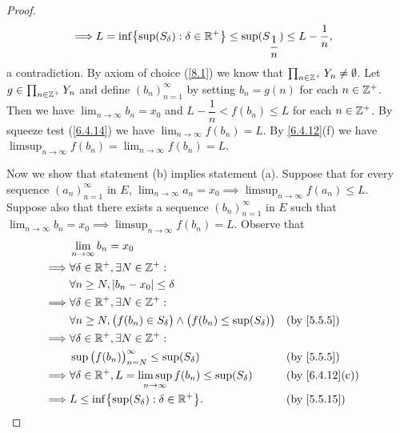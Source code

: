 \begin{proof}
\begin{align*}
    \implies & L = \inf\set{\sup(S_{\delta}) : \delta \in \R^+} \leq \sup(S_{\dfrac{1}{n}}) \leq L - \dfrac{1}{n},
  \end{align*}
  a contradiction.
  By axiom of choice (\cref{8.1}) we know that \(\prod_{n \in \mathbb{Z}^+} Y_n \neq \emptyset\).
  Let \(g \in \prod_{n \in \mathbb{Z}^+} Y_n\) and define \((b_n)_{n = 1}^\infty\) by setting \(b_n = g(n)\) for each \(n \in \mathbb{Z}^+\).
  Then we have \(\lim_{n \to \infty} b_n = x_0\) and \(L - \dfrac{1}{n} < f(b_n) \leq L\) for each \(n \in \mathbb{Z}^+\).
  By squeeze test (\cref{6.4.14}) we have \(\lim_{n \to \infty} f(b_n) = L\).
  By \cref{6.4.12}(f) we have \(\limsup_{n \to \infty} f(b_n) = \lim_{n \to \infty} f(b_n) = L\).

  Now we show that statement (b) implies statement (a).
  Suppose that for every sequence \((a_n)_{n = 1}^\infty\) in \(E\), \(\lim_{n \to \infty} a_n = x_0 \implies \limsup_{n \to \infty} f(a_n) \leq L\).
  Suppose also that there exists a sequence \((b_n)_{n = 1}^\infty\) in \(E\) such that \(\lim_{n \to \infty} b_n = x_0 \implies \limsup_{n \to \infty} f(b_n) = L\).
  Observe that
  \begin{align*}
             & \lim_{n \to \infty} b_n = x_0                                                                                      \\
    \implies & \forall \delta \in \R^+, \exists N \in \Z^+ :                                                                      \\
             & \forall n \geq N, \abs{b_n - x_0} \leq \delta                                                                      \\
    \implies & \forall \delta \in \R^+, \exists N \in \Z^+ :                                                                      \\
             & \forall n \geq N, \big(f(b_n) \in S_{\delta}\big) \land \big(f(b_n) \leq \sup(S_{\delta})\big) &  & \by{5.5.5}     \\
    \implies & \forall \delta \in \R^+, \exists N \in \Z^+ :                                                                      \\
             & \sup\big(f(b_n)\big)_{n = N}^\infty \leq \sup(S_{\delta})                                      &  & \by{5.5.5}     \\
    \implies & \forall \delta \in \R^+, L = \limsup_{n \to \infty} f(b_n) \leq \sup(S_{\delta})               &  & \by{6.4.12}[c] \\
    \implies & L \leq \inf\set{\sup(S_{\delta}) : \delta \in \R^+}.                                           &  & \by{5.5.15}

\end{align*}
\end{proof}
